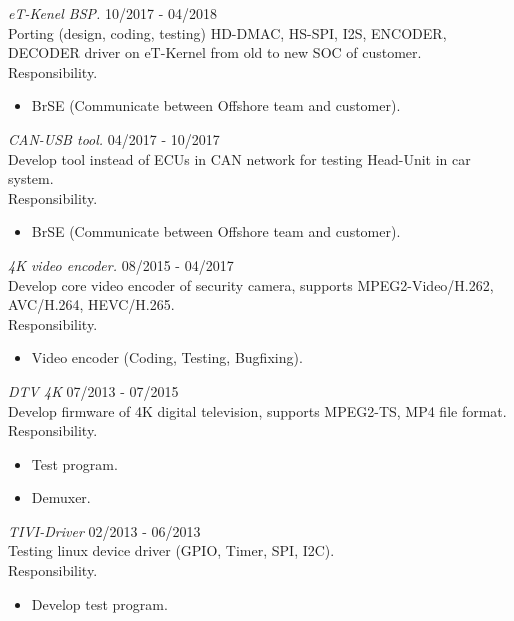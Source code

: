 \documentclass[margin]{res}
\begin{document}
\begin{resume}
                {\sl eT-Kenel BSP.} \hfill            10/2017 - 04/2018 \\
		 Porting (design, coding, testing) HD-DMAC, HS-SPI, I2S, ENCODER, DECODER driver on eT-Kernel from old to new SOC of customer.\\
		 Responsibility.
                 \begin{itemize}  \itemsep -2pt %
                 \item BrSE (Communicate between Offshore team and customer).
                 \end{itemize}

                {\sl CAN-USB tool.} \hfill            04/2017 - 10/2017 \\
		 Develop tool instead of ECUs in CAN network for testing Head-Unit in car system.\\
		 Responsibility.
                 \begin{itemize}  \itemsep -2pt %
                 \item BrSE (Communicate between Offshore team and customer).
                 \end{itemize}

                {\sl 4K video encoder.} \hfill            08/2015 - 04/2017 \\
		 Develop core video encoder of security camera, supports MPEG2-Video/H.262, AVC/H.264, HEVC/H.265.\\
		 Responsibility.
                 \begin{itemize}  \itemsep -2pt %
                 \item Video encoder (Coding, Testing, Bugfixing).
                 \end{itemize}

                {\sl DTV 4K} \hfill            07/2013 - 07/2015 \\
		 Develop firmware of 4K digital television, supports MPEG2-TS, MP4 file format.\\
		 Responsibility.
                 \begin{itemize}  \itemsep -2pt %
                 \item Test program.
                 \item Demuxer.
                 \end{itemize}

                {\sl TIVI-Driver} \hfill            02/2013 - 06/2013 \\
		 Testing linux device driver (GPIO, Timer, SPI, I2C).\\
		 Responsibility.
                 \begin{itemize}  \itemsep -2pt %
                 \item Develop test program.
                 \end{itemize}


\end{resume}
\end{document}
